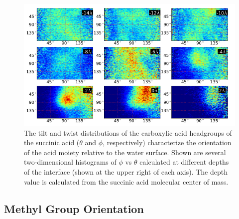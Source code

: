 \begin{figure}[h!]
	\begin{center}
		\includegraphics[scale=1.0]{images/bond-angles/carbonyl-theta-phi.png}
		\caption{The tilt and twist distributions of the carboxylic acid headgroups of the succinic acid ($\theta$ and $\phi$, respectively) characterize the orientation of the acid moiety relative to the water surface. Shown are several two-dimensional histograms of $\phi$ vs $\theta$ calculated at different depths of the interface (shown at the upper right of each axis). The depth value is calculated from the succinic acid molecular center of mass.} 
		\label{fig:carbonyl-theta-phi}
	\end{center}
\end{figure}


\subsection* {Methyl Group Orientation}

